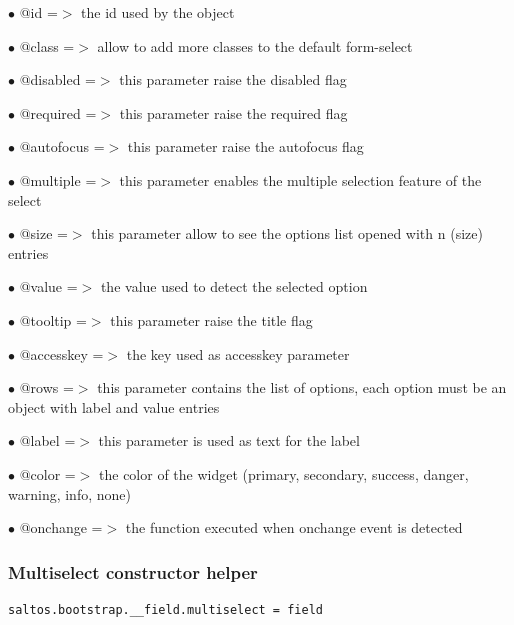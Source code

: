 \documentclass[a4paper]{article}
\begin{document}
\begin{compactitem}
\item[\color{myblue}$\bullet$] @id        =$>$ the id used by the object
\item[\color{myblue}$\bullet$] @class     =$>$ allow to add more classes to the default form-select
\item[\color{myblue}$\bullet$] @disabled  =$>$ this parameter raise the disabled flag
\item[\color{myblue}$\bullet$] @required  =$>$ this parameter raise the required flag
\item[\color{myblue}$\bullet$] @autofocus =$>$ this parameter raise the autofocus flag
\item[\color{myblue}$\bullet$] @multiple  =$>$ this parameter enables the multiple selection feature of the select
\item[\color{myblue}$\bullet$] @size      =$>$ this parameter allow to see the options list opened with n (size) entries
\item[\color{myblue}$\bullet$] @value     =$>$ the value used to detect the selected option
\item[\color{myblue}$\bullet$] @tooltip   =$>$ this parameter raise the title flag
\item[\color{myblue}$\bullet$] @accesskey =$>$ the key used as accesskey parameter
\item[\color{myblue}$\bullet$] @rows      =$>$ this parameter contains the list of options, each option must be an object
              with label and value entries
\item[\color{myblue}$\bullet$] @label     =$>$ this parameter is used as text for the label
\item[\color{myblue}$\bullet$] @color     =$>$ the color of the widget (primary, secondary, success, danger, warning, info, none)
\item[\color{myblue}$\bullet$] @onchange  =$>$ the function executed when onchange event is detected
\end{compactitem}

\hypertarget{toc64}{}
\subsubsection{Multiselect constructor helper}

\begin{lstlisting}
saltos.bootstrap.__field.multiselect = field
\end{lstlisting}
\end{document}
